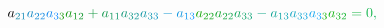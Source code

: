 \documentclass[12pt]{article}
\begin{document}
\begin{displaymath}
{a} _ { \mathcolor[RGB]{15,135,165}{2} \mathcolor[RGB]{15,135,180}{1} } \mathcolor[RGB]{15,135,195}{a} _ { \mathcolor[RGB]{15,135,210}{2} \mathcolor[RGB]{15,135,225}{2} } \mathcolor[RGB]{15,135,240}{a} _ { \mathcolor[RGB]{15,135,255}{3} \mathcolor[RGB]{15,150,0}{3} } \mathcolor[RGB]{15,150,15}{a} _ { \mathcolor[RGB]{15,150,30}{1} \mathcolor[RGB]{15,150,45}{2} } \mathcolor[RGB]{15,150,60}{+} \mathcolor[RGB]{15,150,75}{a} _ { \mathcolor[RGB]{15,150,90}{1} \mathcolor[RGB]{15,150,105}{1} } \mathcolor[RGB]{15,150,120}{a} _ { \mathcolor[RGB]{15,150,135}{3} \mathcolor[RGB]{15,150,150}{2} } \mathcolor[RGB]{15,150,165}{a} _ { \mathcolor[RGB]{15,150,180}{3} \mathcolor[RGB]{15,150,195}{3} } \mathcolor[RGB]{15,150,210}{-} \mathcolor[RGB]{15,150,225}{a} _ { \mathcolor[RGB]{15,150,240}{1} \mathcolor[RGB]{15,150,255}{3} } \mathcolor[RGB]{15,165,0}{a} _ { \mathcolor[RGB]{15,165,15}{2} \mathcolor[RGB]{15,165,30}{2} } \mathcolor[RGB]{15,165,45}{a} _ { \mathcolor[RGB]{15,165,60}{2} \mathcolor[RGB]{15,165,75}{2} } \mathcolor[RGB]{15,165,90}{a} _ { \mathcolor[RGB]{15,165,105}{3} \mathcolor[RGB]{15,165,120}{3} } \mathcolor[RGB]{15,165,135}{-} \mathcolor[RGB]{15,165,150}{a} _ { \mathcolor[RGB]{15,165,165}{1} \mathcolor[RGB]{15,165,180}{3} } \mathcolor[RGB]{15,165,195}{a} _ { \mathcolor[RGB]{15,165,210}{3} \mathcolor[RGB]{15,165,225}{3} } \mathcolor[RGB]{15,165,240}{a} _ { \mathcolor[RGB]{15,165,255}{3} \mathcolor[RGB]{15,180,0}{3} } \mathcolor[RGB]{15,180,15}{a} _ { \mathcolor[RGB]{15,180,30}{3} \mathcolor[RGB]{15,180,45}{2} } \mathcolor[RGB]{15,180,60}{=} \mathcolor[RGB]{15,180,75}{0} \mathcolor[RGB]{15,180,90}{,} \mathcolor[RGB]{15,180,105}{\,
}
\end{displaymath}
\end{document}
